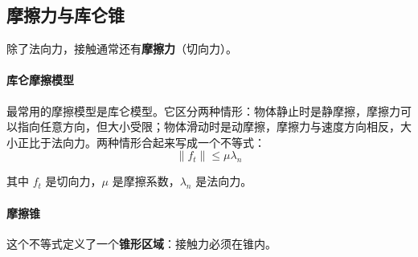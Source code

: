 \subsection{摩擦力与库仑锥}

除了法向力，接触通常还有\textbf{摩擦力}（切向力）。

\paragraph{库仑摩擦模型}

最常用的摩擦模型是库仑模型。它区分两种情形：物体静止时是静摩擦，摩擦力可以指向任意方向，但大小受限；物体滑动时是动摩擦，摩擦力与速度方向相反，大小正比于法向力。两种情形合起来写成一个不等式：
\[
\|f_t\| \leq \mu \lambda_n
\]

其中 $f_t$ 是切向力，$\mu$ 是摩擦系数，$\lambda_n$ 是法向力。

\paragraph{摩擦锥}

这个不等式定义了一个\textbf{锥形区域}：接触力必须在锥内。

